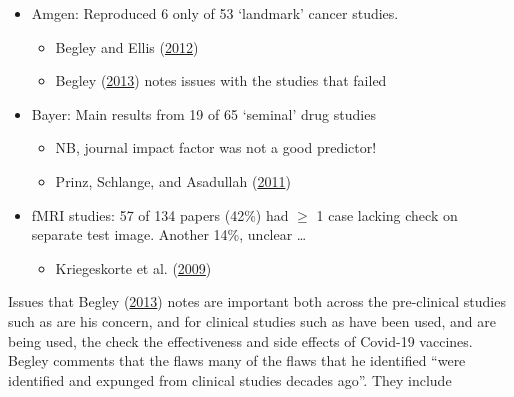 \documentclass[
  10pt,
  b5paper]{book}
\providecommand{\tightlist}{%
  \setlength{\itemsep}{0pt}\setlength{\parskip}{0pt}}
\begin{document}
\begin{itemize}
\tightlist
\item
  Amgen: Reproduced 6 only of 53 `landmark' cancer studies.

  \begin{itemize}
  \tightlist
  \item
    Begley and Ellis (\protect\hyperlink{ref-r23_begley_ellis_2012}{2012})
  \item
    Begley (\protect\hyperlink{ref-r2_begley_2013}{2013}) notes issues with the studies that failed
  \end{itemize}
\item
  Bayer: Main results from 19 of 65 `seminal' drug studies

  \begin{itemize}
  \tightlist
  \item
    NB, journal impact factor was not a good predictor!
  \item
    Prinz, Schlange, and Asadullah (\protect\hyperlink{ref-r9_prinz_schlange_asadullah_2011}{2011})
  \end{itemize}
\item
  fMRI studies: 57 of 134 papers (42\%) had \(\geq\) 1 case lacking
  check on separate test image.
  Another 14\%, unclear \ldots{}

  \begin{itemize}
  \tightlist
  \item
    Kriegeskorte et al. (\protect\hyperlink{ref-r8_kriegeskorte_simmons_bellgowan_baker_2009}{2009})
  \end{itemize}
\end{itemize}

Issues that Begley (\protect\hyperlink{ref-r2_begley_2013}{2013}) notes are important both across
the pre-clinical studies such as are his concern, and for
clinical studies such as have been used, and are being used,
the check the effectiveness and side effects of Covid-19
vaccines. Begley comments that the flaws many of the
flaws that he identified ``were identified and expunged from
clinical studies decades ago''. They include
\end{document}
